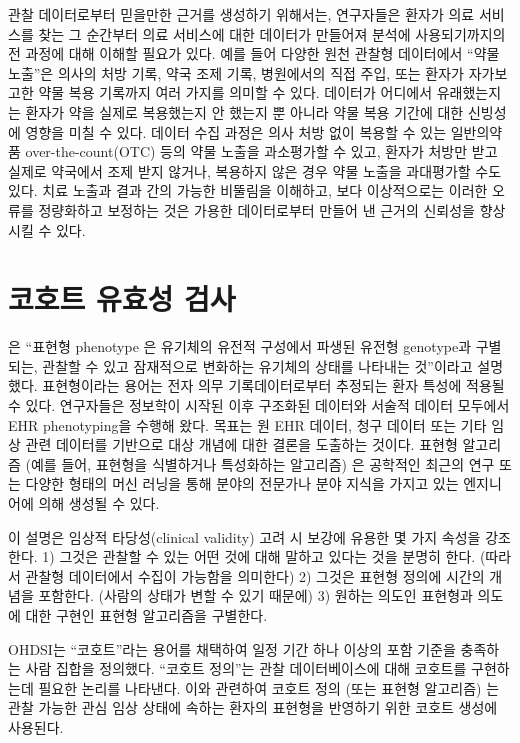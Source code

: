 \documentclass[10.5pt]{book}
\theoremstyle{definition}
\theoremstyle{definition}
\theoremstyle{definition}
\theoremstyle{remark}
\begin{document}
관찰 데이터로부터 믿을만한 근거를 생성하기 위해서는, 연구자들은 환자가
의료 서비스를 찾는 그 순간부터 의료 서비스에 대한 데이터가 만들어져
분석에 사용되기까지의 전 과정에 대해 이해할 필요가 있다. 예를 들어
다양한 원천 관찰형 데이터에서 ``약물 노출''은 의사의 처방 기록, 약국
조제 기록, 병원에서의 직접 주입, 또는 환자가 자가보고한 약물 복용
기록까지 여러 가지를 의미할 수 있다. 데이터가 어디에서 유래했는지는
환자가 약을 실제로 복용했는지 안 했는지 뿐 아니라 약물 복용 기간에 대한
신빙성에 영향을 미칠 수 있다. 데이터 수집 과정은 의사 처방 없이 복용할
수 있는 일반의약품 over-the-count(OTC) 등의 약물 노출을 과소평가할 수
있고, 환자가 처방만 받고 실제로 약국에서 조제 받지 않거나, 복용하지 않은
경우 약물 노출을 과대평가할 수도 있다. 치료 노출과 결과 간의 가능한
비뚤림을 이해하고, 보다 이상적으로는 이러한 오류를 정량화하고 보정하는
것은 가용한 데이터로부터 만들어 낸 근거의 신뢰성을 향상시킬 수 있다.

\section{코호트 유효성 검사}\label{CohortValidation}

\citet{hripcsak_2017} 은 ``표현형 phenotype 은 유기체의 유전적 구성에서
파생된 유전형 genotype과 구별되는, 관찰할 수 있고 잠재적으로 변화하는
유기체의 상태를 나타내는 것''이라고 설명했다. 표현형이라는 용어는 전자
의무 기록데이터로부터 추정되는 환자 특성에 적용될 수 있다. 연구자들은
정보학이 시작된 이후 구조화된 데이터와 서술적 데이터 모두에서 EHR
phenotyping을 수행해 왔다. 목표는 원 EHR 데이터, 청구 데이터 또는 기타
임상 관련 데이터를 기반으로 대상 개념에 대한 결론을 도출하는 것이다.
표현형 알고리즘 (예를 들어, 표현형을 식별하거나 특성화하는 알고리즘) 은
공학적인 최근의 연구 또는 다양한 형태의 머신 러닝을 통해 분야의 전문가나
분야 지식을 가지고 있는 엔지니어에 의해 생성될 수 있다.

이 설명은 임상적 타당성(clinical validity) 고려 시 보강에 유용한 몇 가지
속성을 강조한다. 1) 그것은 관찰할 수 있는 어떤 것에 대해 말하고 있다는
것을 분명히 한다. (따라서 관찰형 데이터에서 수집이 가능함을 의미한다) 2)
그것은 표현형 정의에 시간의 개념을 포함한다. (사람의 상태가 변할 수 있기
때문에) 3) 원하는 의도인 표현형과 의도에 대한 구현인 표현형 알고리즘을
구별한다.

OHDSI는 ``코호트''라는 용어를 채택하여 일정 기간 하나 이상의 포함 기준을
충족하는 사람 집합을 정의했다. ``코호트 정의''는 관찰 데이터베이스에
대해 코호트를 구현하는데 필요한 논리를 나타낸다. 이와 관련하여 코호트
정의 (또는 표현형 알고리즘) 는 관찰 가능한 관심 임상 상태에 속하는
환자의 표현형을 반영하기 위한 코호트 생성에 사용된다.
\end{document}
